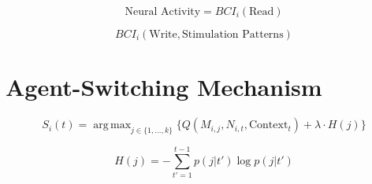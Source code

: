 \documentclass[12pt, a4paper]{article}
\DeclareMathOperator*{\argmax}{arg\,max}
\begin{document}
\begin{equation}
\text{Neural Activity} = BCI_i(\text{Read})
\end{equation}

\begin{equation}
BCI_i(\text{Write}, \text{Stimulation Patterns})
\end{equation}

\section{Agent-Switching Mechanism}

\begin{equation}
S_i(t) = \argmax_{j \in \{1, \dots, k\}} \{Q(M_{i,j}, N_{i,t}, \text{Context}_t) + \lambda \cdot H(j)\}
\end{equation}

\begin{equation}
H(j) = -\sum_{t'=1}^{t-1} p(j|t') \log p(j|t')
\end{equation}
\end{document}
